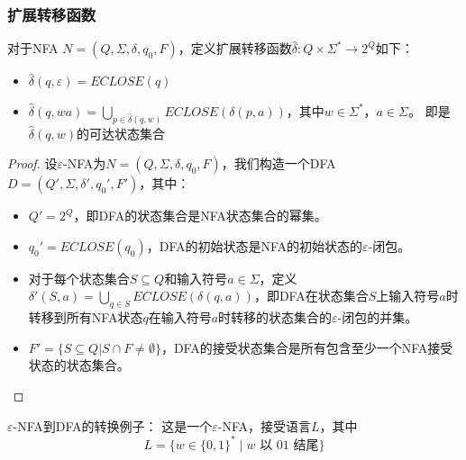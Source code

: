 \documentclass{article}
\begin{document}
\subsubsection{扩展转移函数}
对于NFA $N=(Q, \Sigma, \delta, q_0, F)$，定义扩展转移函数$\hat{\delta}: Q \times \Sigma^* \to 2^Q$如下：
\begin{itemize}
\item $\hat{\delta}(q, \varepsilon) = ECLOSE(q)$
\item $\hat{\delta}(q, wa) = \bigcup_{p \in \hat{\delta}(q, w)} ECLOSE(\delta(p, a))$，其中$w \in \Sigma^*$，$a \in \Sigma$。
即是$\hat{\delta}(q, w)$的可达状态集合
\end{itemize}
\begin{proof}
设$\varepsilon$-NFA为$N=(Q, \Sigma, \delta, q_0, F)$，我们构造一个DFA$D=(Q', \Sigma, \delta', q_0', F')$，其中：
\begin{itemize}
\item $Q' = 2^Q$，即DFA的状态集合是NFA状态集合的幂集。
\item $q_0' = ECLOSE(q_0)$，DFA的初始状态是NFA的初始状态的$\varepsilon$-闭包。
\item 对于每个状态集合$S \subseteq Q$和输入符号$a \in \Sigma$，定义$\delta'(S, a) = \bigcup_{q \in S} ECLOSE(\delta(q, a))$，即DFA在状态集合$S$上输入符号$a$时转移到所有NFA状态$q$在输入符号$a$时转移的状态集合的$\varepsilon$-闭包的并集。
\item $F' = \{S \subseteq Q | S \cap F \neq \emptyset\}$，DFA的接受状态集合是所有包含至少一个NFA接受状态的状态集合。
\end{itemize}
\end{proof}
$\varepsilon$-NFA到DFA的转换例子：
这是一个$\varepsilon$-NFA，接受语言$L$，其中
\[L=\{w \in \{0,1\}^* \mid w \text{ 以 }01\text{ 结尾}\}\]
\begin{center}
\end{center}
\end{document}

